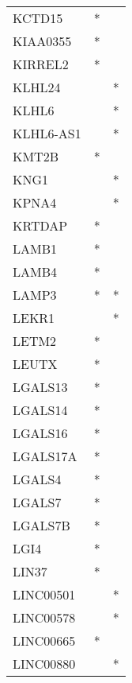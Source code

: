 \begin{longtable}{lcc}
KCTD15           &              * &            \\
KIAA0355         &              * &            \\
KIRREL2          &              * &            \\
KLHL24           &                &          * \\
KLHL6            &                &          * \\
KLHL6-AS1        &                &          * \\
KMT2B            &              * &            \\
KNG1             &                &          * \\
KPNA4            &                &          * \\
KRTDAP           &              * &            \\
LAMB1            &              * &            \\
LAMB4            &              * &            \\
LAMP3            &              * &          * \\
LEKR1            &                &          * \\
LETM2            &              * &            \\
LEUTX            &              * &            \\
LGALS13          &              * &            \\
LGALS14          &              * &            \\
LGALS16          &              * &            \\
LGALS17A         &              * &            \\
LGALS4           &              * &            \\
LGALS7           &              * &            \\
LGALS7B          &              * &            \\
LGI4             &              * &            \\
LIN37            &              * &            \\
LINC00501        &                &          * \\
LINC00578        &                &          * \\
LINC00665        &              * &            \\
LINC00880        &                &          * \\

\end{longtable}
